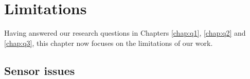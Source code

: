 \documentclass[11pt,twosided,a4paper]{report}
\begin{document}
%




%
%

\chapter{Limitations} \label{chap:limitations}

Having answered our research questions in Chapters \ref{chap:q1}, \ref{chap:q2} and \ref{chap:q3}, this chapter now focuses on the limitations of our work.

\section{Sensor issues}
\end{document}
